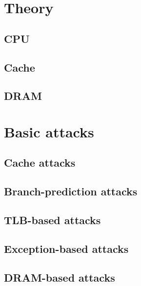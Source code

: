 \documentclass[final, xcolor = table, usenames, dvipsnames, table, aspectratio = 169]{beamer}
\begin{document}
\section{Theory}
\subsection{CPU}


\subsection{Cache}


\subsection{DRAM}




\section{Basic attacks}
\subsection{Cache attacks}


\subsection{Branch-prediction attacks}


\subsection{TLB-based attacks}


\subsection{Exception-based attacks}


\subsection{DRAM-based attacks}

\end{document}
